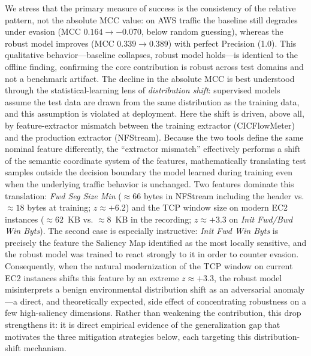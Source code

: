\documentclass{iaesarticle}
\begin{document}
We stress that the primary measure of success is the consistency of the relative pattern, not the absolute MCC value: on AWS traffic the baseline still degrades under evasion (MCC $0.164\rightarrow-0.070$, below random guessing), whereas the robust model improves (MCC $0.339\rightarrow0.389$) with perfect Precision (1.0). This qualitative behavior---baseline collapses, robust model holds---is identical to the offline finding, confirming the core contribution is robust across test domains and not a benchmark artifact. The decline in the absolute MCC is best understood through the statistical-learning lens of \textit{distribution shift}: supervised models assume the test data are drawn from the same distribution as the training data, and this assumption is violated at deployment. Here the shift is driven, above all, by feature-extractor mismatch between the training extractor (CICFlowMeter) and the production extractor (NFStream). Because the two tools define the same nominal feature differently, the ``extractor mismatch'' effectively performs a shift of the semantic coordinate system of the features, mathematically translating test samples outside the decision boundary the model learned during training even when the underlying traffic behavior is unchanged. Two features dominate this translation: \textit{Fwd Seg Size Min} ($\approx66$ bytes in NFStream including the header vs. $\approx18$ bytes at training; $z\approx+6.2$) and the TCP window size on modern EC2 instances ($\approx62$~KB vs. $\approx8$~KB in the recording; $z\approx+3.3$ on \textit{Init Fwd/Bwd Win Byts}). The second case is especially instructive: \textit{Init Fwd Win Byts} is precisely the feature the Saliency Map identified as the most locally sensitive, and the robust model was trained to react strongly to it in order to counter evasion. Consequently, when the natural modernization of the TCP window on current EC2 instances shifts this feature by an extreme $z\approx+3.3$, the robust model misinterprets a benign environmental distribution shift as an adversarial anomaly---a direct, and theoretically expected, side effect of concentrating robustness on a few high-saliency dimensions. Rather than weakening the contribution, this drop strengthens it: it is direct empirical evidence of the generalization gap that motivates the three mitigation strategies below, each targeting this distribution-shift mechanism.
\end{document}
